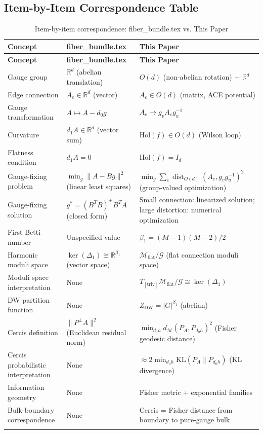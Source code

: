 \documentclass[12pt,a4paper]{article}
\theoremstyle{definition}
\theoremstyle{remark}
\theoremstyle{definition}
\newcommand{\R}{\mathbb{R}}
\newcommand{\Od}{O(d)}
\newcommand{\face}{\ensuremath{\mathit{f}}}
\newcommand{\Lone}{\Delta_1}
\newcommand{\Hol}{\mathrm{Hol}}
\newcommand{\triv}{\mathrm{triv}}
\newcommand{\KL}{\mathrm{KL}}
\newcommand{\GeoDist}{d_{\mathcal{M}}}
\newcommand{\DW}{\mathrm{DW}}
\newcommand{\ZBetti}{\beta_1}
\newcommand{\Gflatquot}{\mathcal{M}_{\mathrm{flat}}/\mathcal{G}}
\DeclareMathOperator{\dist}{dist}
\begin{document}
\subsection{Item-by-Item Correspondence Table}

\begin{center}
\begin{longtable}{@{}p{3.5cm} p{4cm} p{5cm}@{}}
\toprule
\textbf{Concept} & \textbf{fiber\_bundle.tex} & \textbf{This Paper} \\
\midrule
\endfirsthead
\toprule
\textbf{Concept} & \textbf{fiber\_bundle.tex} & \textbf{This Paper} \\
\midrule
\endhead
Gauge group & $\R^d$ (abelian translation) & $\Od$ (non-abelian rotation) $+$ $\R^d$ \\
\midrule
Edge connection & $A_e \in \R^d$ (vector) & $A_e \in \Od$ (matrix, ACE potential) \\
\midrule
Gauge transformation & $A \mapsto A - d_0 g$ & $A_e \mapsto g_v A_e g_u^{-1}$ \\
\midrule
Curvature & $d_1 A \in \R^d$ (vector sum) & $\Hol(\face) \in \Od$ (Wilson loop) \\
\midrule
Flatness condition & $d_1 A = 0$ & $\Hol(\face) = I_d$ \\
\midrule
Gauge-fixing problem & $\min_g \|A - B g\|^2$ (linear least squares) & $\min_g \sum_e \dist_{\Od}(A_e, g_v g_u^{-1})^2$ (group-valued optimization) \\
\midrule
Gauge-fixing solution & $g^* = (B^T B)^+ B^T A$ (closed form) & Small connection: linearized solution; large distortion: numerical optimization \\
\midrule
First Betti number & Unspecified value & $\ZBetti = (M-1)(M-2)/2$ \\
\midrule
Harmonic moduli space & $\ker(\Lone) \cong \R^{\ZBetti}$ (vector space) & $\Gflatquot$ (flat connection moduli space) \\
\midrule
Moduli space interpretation & None & $T_{[\triv]}\Gflatquot \cong \ker(\Lone)$ \\
\midrule
DW partition function & None & $Z_{\DW} = |G|^{\ZBetti}$ (abelian) \\
\midrule
Cercis definition & $\|P^\perp A\|^2$ (Euclidean residual norm) & $\min_{d_0 h} \GeoDist(P_A, P_{d_0 h})^2$ (Fisher geodesic distance)\footnotemark \\
\midrule
Cercis probabilistic interpretation & None & $\approx 2\min_{d_0 h} \KL(P_A \| P_{d_0 h})$ (KL divergence)\footnotemark[\value{footnote}] \\
\midrule
Information geometry & None & Fisher metric $+$ exponential families \\
\midrule
Bulk-boundary correspondence & None & Cercis = Fisher distance from boundary to pure-gauge bulk \\
\bottomrule
\caption{Item-by-item correspondence: fiber\_bundle.tex vs. This Paper}
\label{tab:comparison}
\end{longtable}
\end{center}
\end{document}
